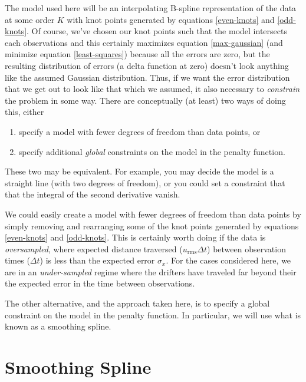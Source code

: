 \documentclass[twocol]{ametsoc}
\begin{document}
The model used here will be an interpolating B-spline representation of the data at some order $K$ with knot points generated by equations \ref{even-knots} and \ref{odd-knots}. Of course, we've chosen our knot points such that the model intersects each observations and this certainly maximizes equation \ref{max-gaussian} (and minimize equation \ref{least-squares}) because all the errors are zero, but the resulting distribution of errors (a delta function at zero) doesn't look anything like the assumed Gaussian distribution. Thus, if we want the error distribution that we get out to look like that which we assumed, it also necessary to \emph{constrain} the problem in some way. There are conceptually (at least) two ways of doing this, either 
\begin{enumerate}
\item specify a model with fewer degrees of freedom than data points, or
\item specify additional \emph{global} constraints on the model in the penalty function.
\end{enumerate}
These two may be equivalent. For example, you may decide the model is a straight line (with two degrees of freedom), or you could set a constraint that that the integral of the second derivative vanish.

We could easily create a model with fewer degrees of freedom than data points by simply removing and rearranging  some of the knot points generated by equations \ref{even-knots} and \ref{odd-knots}. This is certainly worth doing if the data is \emph{oversampled}, where expected distance traversed ($u_{\textrm{rms}}\Delta t$) between observation times ($\Delta t$) is less than the expected error $\sigma_x$. For the cases considered here, we are in an \emph{under-sampled} regime where the drifters have traveled far beyond their the expected error in the time between observations.

The other alternative, and the approach taken here, is to specify a global constraint on the model in the penalty function. In particular, we will use what is known as a smoothing spline.

%
\section{Smoothing Spline}
%
\end{document}
